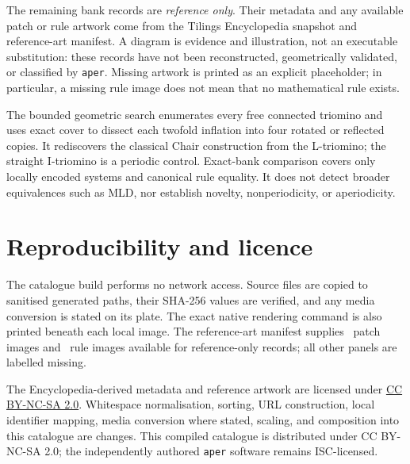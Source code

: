 \documentclass[10pt]{article}
\begin{document}
The remaining bank records are \emph{reference only}. Their metadata and any
available patch or rule artwork come from the Tilings Encyclopedia snapshot
and reference-art manifest. A diagram is evidence and illustration, not an
executable substitution: these records have not been reconstructed,
geometrically validated, or classified by \texttt{aper}. Missing artwork is
printed as an explicit placeholder; in particular, a missing rule image does
not mean that no mathematical rule exists.

The bounded geometric search enumerates every free connected triomino and uses
exact cover to dissect each twofold inflation into four rotated or reflected
copies. It rediscovers the classical Chair construction from the L-triomino;
the straight I-triomino is a periodic control. Exact-bank comparison covers
only locally encoded systems and canonical rule equality. It does not
detect broader equivalences such as MLD, nor establish novelty,
nonperiodicity, or aperiodicity.

\section*{Reproducibility and licence}

The catalogue build performs no network access. Source files are copied to
sanitised generated paths, their SHA-256 values are verified, and any media
conversion is stated on its plate. The exact native rendering command is also
printed beneath each local image. The reference-art manifest supplies
\CatalogueReferencePatchCount\ patch images and
\CatalogueReferenceRuleCount\ rule images available for reference-only
records; all other panels are labelled missing.

The Encyclopedia-derived metadata and reference artwork are licensed under
\href{https://creativecommons.org/licenses/by-nc-sa/2.0/}{CC BY-NC-SA 2.0}.
Whitespace normalisation, sorting, URL construction, local identifier mapping,
media conversion where stated, scaling, and composition into this catalogue
are changes. This compiled catalogue is distributed under CC BY-NC-SA 2.0;
the independently authored \texttt{aper} software remains ISC-licensed.



\end{document}
